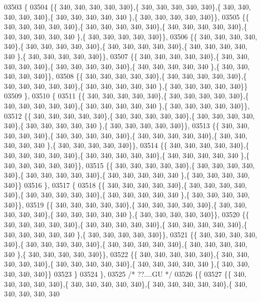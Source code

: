 \begin{DoxyCode}
03503 \{
03504 \{\{ 340, 340, 340, 340, 340\},\{ 340, 340, 340, 340, 340\},\{ 340, 340, 340, 340, 340\},\{ 340, 340, 340, 340, 340
      \},\{ 340, 340, 340, 340, 340\}\},
03505 \{\{ 340, 340, 340, 340, 340\},\{ 340, 340, 340, 340, 340\},\{ 340, 340, 340, 340, 340\},\{ 340, 340, 340, 340, 340
      \},\{ 340, 340, 340, 340, 340\}\},
03506 \{\{ 340, 340, 340, 340, 340\},\{ 340, 340, 340, 340, 340\},\{ 340, 340, 340, 340, 340\},\{ 340, 340, 340, 340, 340
      \},\{ 340, 340, 340, 340, 340\}\},
03507 \{\{ 340, 340, 340, 340, 340\},\{ 340, 340, 340, 340, 340\},\{ 340, 340, 340, 340, 340\},\{ 340, 340, 340, 340, 340
      \},\{ 340, 340, 340, 340, 340\}\},
03508 \{\{ 340, 340, 340, 340, 340\},\{ 340, 340, 340, 340, 340\},\{ 340, 340, 340, 340, 340\},\{ 340, 340, 340, 340, 340
      \},\{ 340, 340, 340, 340, 340\}\}
03509 \},
03510 \{
03511 \{\{ 340, 340, 340, 340, 340\},\{ 340, 340, 340, 340, 340\},\{ 340, 340, 340, 340, 340\},\{ 340, 340, 340, 340, 340
      \},\{ 340, 340, 340, 340, 340\}\},
03512 \{\{ 340, 340, 340, 340, 340\},\{ 340, 340, 340, 340, 340\},\{ 340, 340, 340, 340, 340\},\{ 340, 340, 340, 340, 340
      \},\{ 340, 340, 340, 340, 340\}\},
03513 \{\{ 340, 340, 340, 340, 340\},\{ 340, 340, 340, 340, 340\},\{ 340, 340, 340, 340, 340\},\{ 340, 340, 340, 340, 340
      \},\{ 340, 340, 340, 340, 340\}\},
03514 \{\{ 340, 340, 340, 340, 340\},\{ 340, 340, 340, 340, 340\},\{ 340, 340, 340, 340, 340\},\{ 340, 340, 340, 340, 340
      \},\{ 340, 340, 340, 340, 340\}\},
03515 \{\{ 340, 340, 340, 340, 340\},\{ 340, 340, 340, 340, 340\},\{ 340, 340, 340, 340, 340\},\{ 340, 340, 340, 340, 340
      \},\{ 340, 340, 340, 340, 340\}\}
03516 \},
03517 \{
03518 \{\{ 340, 340, 340, 340, 340\},\{ 340, 340, 340, 340, 340\},\{ 340, 340, 340, 340, 340\},\{ 340, 340, 340, 340, 340
      \},\{ 340, 340, 340, 340, 340\}\},
03519 \{\{ 340, 340, 340, 340, 340\},\{ 340, 340, 340, 340, 340\},\{ 340, 340, 340, 340, 340\},\{ 340, 340, 340, 340, 340
      \},\{ 340, 340, 340, 340, 340\}\},
03520 \{\{ 340, 340, 340, 340, 340\},\{ 340, 340, 340, 340, 340\},\{ 340, 340, 340, 340, 340\},\{ 340, 340, 340, 340, 340
      \},\{ 340, 340, 340, 340, 340\}\},
03521 \{\{ 340, 340, 340, 340, 340\},\{ 340, 340, 340, 340, 340\},\{ 340, 340, 340, 340, 340\},\{ 340, 340, 340, 340, 340
      \},\{ 340, 340, 340, 340, 340\}\},
03522 \{\{ 340, 340, 340, 340, 340\},\{ 340, 340, 340, 340, 340\},\{ 340, 340, 340, 340, 340\},\{ 340, 340, 340, 340, 340
      \},\{ 340, 340, 340, 340, 340\}\}
03523 \}
03524 \},
03525 \textcolor{comment}{/* ??....GU */}
03526 \{\{
03527 \{\{ 340, 340, 340, 340, 340\},\{ 340, 340, 340, 340, 340\},\{ 340, 340, 340, 340, 340\},\{ 340, 340, 340, 340, 340

\end{DoxyCode}

